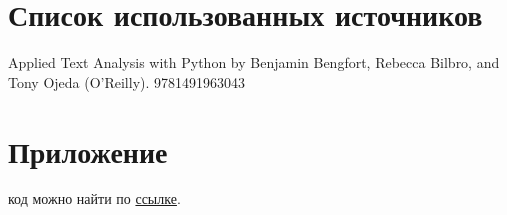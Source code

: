 \documentclass{article}
\newcommand\tab[1][1cm]{\hspace*{#1}}
\begin{document}
\section*{Список использованных источников}
\renewcommand{\refname}{}
\begin{thebibliography}{7}
 Applied Text Analysis with Python by Benjamin Bengfort, Rebecca Bilbro, and Tony Ojeda (O’Reilly). 978­1­491­96304­3
\end{thebibliography}
\newpage
{}
\section*{Приложение}
 код можно найти по \href{https://github.com/dokapoka/paper_text_classification}{ссылке}.





 
\end{document}
